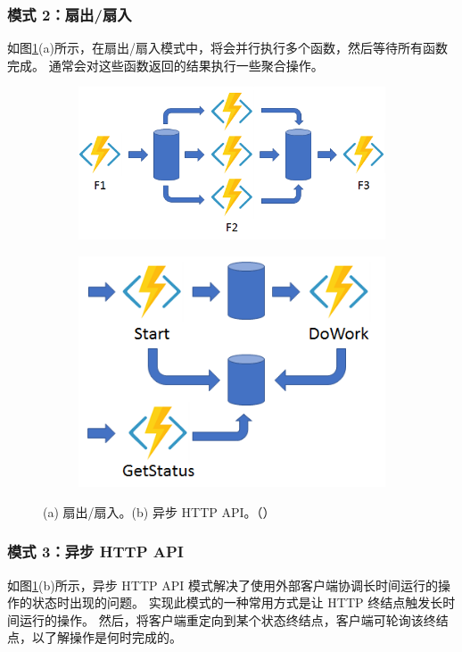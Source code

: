 \subsubsection{模式 2：扇出/扇入}
如图\ref{fig:model2-3}(a)所示，在扇出/扇入模式中，将会并行执行多个函数，然后等待所有函数完成。 通常会对这些函数返回的结果执行一些聚合操作。
\begin{figure}[!htbp]
	\begin{subfigure}[b]{0.62\linewidth}
		\includegraphics[width=\linewidth]{figs/model2}
		\caption{}
	\end{subfigure}
	\begin{subfigure}[b]{0.38\linewidth}
		\includegraphics[width=\linewidth]{figs/model3}
		\caption{}
	\end{subfigure}
	\caption{(a) 扇出/扇入。(b) 异步 HTTP API。（\cite{Durable}）}
	\label{fig:model2-3}
\end{figure}

\subsubsection{模式 3：异步 HTTP API}
如图\ref{fig:model2-3}(b)所示，异步 HTTP API 模式解决了使用外部客户端协调长时间运行的操作的状态时出现的问题。 实现此模式的一种常用方式是让 HTTP 终结点触发长时间运行的操作。 然后，将客户端重定向到某个状态终结点，客户端可轮询该终结点，以了解操作是何时完成的。

